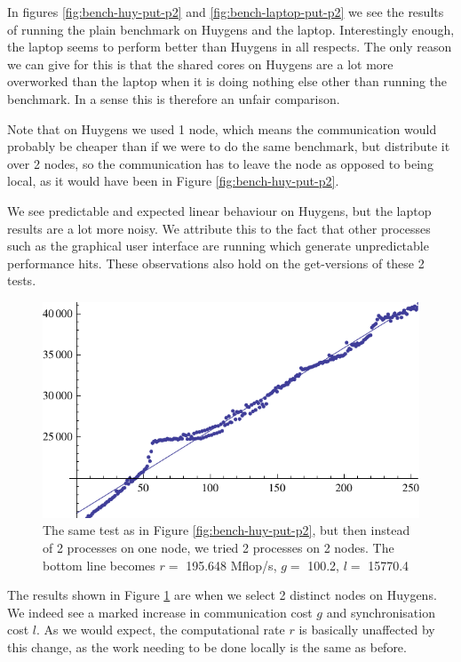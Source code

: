 \documentclass[a4paper]{article}
\begin{document}
In figures \ref{fig:bench-huy-put-p2} and \ref{fig:bench-laptop-put-p2} we see
the results of running the plain benchmark on Huygens and the laptop.
Interestingly enough, the laptop seems to perform better than Huygens in all
respects. The only reason we can give for this is that the shared cores on
Huygens are a lot more overworked than the laptop when it is doing nothing else
other than running the benchmark. In a sense this is therefore an unfair
comparison.

Note that on Huygens we used 1 node, which means the communication would
probably be cheaper than if we were to do the same benchmark, but distribute it
over 2 nodes, so the communication has to leave the node as opposed to being
local, as it would have been in Figure  \ref{fig:bench-huy-put-p2}. 

We see predictable and expected linear behaviour on Huygens, but the laptop
results are a
lot more noisy. We attribute this to the fact that other processes such as the
graphical user interface are running which generate unpredictable performance
hits. These observations also hold on the get-versions of these 2 tests.

\begin{figure}[h]
    \begin{center}
        \includegraphics{img/bench-huy-put-p2-dist.pdf}
    \end{center}
    \caption{The same test as in Figure \ref{fig:bench-huy-put-p2}, but then
    instead of 2 processes on one node, we tried 2 processes on 2 nodes. The
    bottom line becomes $r=$ 195.648 Mflop/s, $g=$ 100.2, $l=$ 15770.4}
    \label{fig:bench-huy-put-p2-dist}
\end{figure}

The results shown in Figure \ref{fig:bench-huy-put-p2-dist} are when we select 2
distinct nodes on Huygens. We indeed see a marked increase in communication cost
$g$ and synchronisation cost $l$. As we would expect, the computational rate $r$
is basically unaffected by this change, as the work needing to be done locally
is the same as before. 
\end{document}
